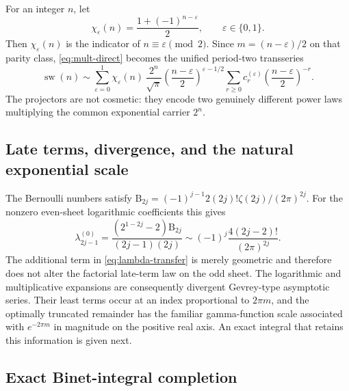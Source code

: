 \documentclass[11pt,a4paper]{article}
\theoremstyle{clean}
\theoremstyle{definition}
\newcommand{\sw}{\operatorname{sw}}
\newcommand{\eps}{\varepsilon}
\newcommand{\B}{\mathrm B}
\begin{document}
For an integer \(n\), let
\begin{equation}
 \chi_\eps(n)=\frac{1+(-1)^{n-\eps}}2,
 \qquad \eps\in\{0,1\}.
 \label{eq:parity-projector}
\end{equation}
Then \(\chi_\eps(n)\) is the indicator of \(n\equiv\eps\pmod2\).  Since \(m=(n-\eps)/2\) on that parity class, \cref{eq:mult-direct} becomes the unified period-two transseries
\begin{equation}
 \boxed{\displaystyle
 \sw(n)\sim
 \sum_{\eps=0}^1\chi_\eps(n)\,
 \frac{2^n}{\sqrt\pi}
 \left(\frac{n-\eps}{2}\right)^{\eps-1/2}
 \sum_{r\ge0}c_r^{(\eps)}
 \left(\frac{n-\eps}{2}\right)^{-r}.}
 \label{eq:unified-n-direct}
\end{equation}
The projectors are not cosmetic: they encode two genuinely different power laws multiplying the common exponential carrier \(2^n\).

\subsection{Late terms, divergence, and the natural exponential scale}
\label{subsec:divergence}

The Bernoulli numbers satisfy
\(
 \B_{2j}=(-1)^{j-1}2(2j)!\zeta(2j)/(2\pi)^{2j}
\).
For the nonzero even-sheet logarithmic coefficients this gives
\begin{equation}
 \lambda_{2j-1}^{(0)}
 =\frac{(2^{1-2j}-2)\B_{2j}}{(2j-1)(2j)}
 \sim (-1)^j\frac{4(2j-2)!}{(2\pi)^{2j}}.
 \label{eq:lambda-late}
\end{equation}
The additional term in \cref{eq:lambda-transfer} is merely geometric and therefore does not alter the factorial late-term law on the odd sheet.  The logarithmic and multiplicative expansions are consequently divergent Gevrey-type asymptotic series.  Their least terms occur at an index proportional to \(2\pi m\), and the optimally truncated remainder has the familiar gamma-function scale associated with \(e^{-2\pi m}\) in magnitude on the positive real axis.  An exact integral that retains this information is given next.

\subsection{Exact Binet-integral completion}
\label{subsec:Binet}
\end{document}

